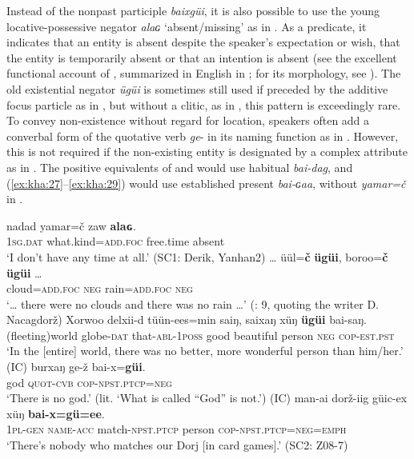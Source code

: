 \documentclass[output=paper,colorlinks,citecolor=brown,chinesefont]{langscibook}
\begin{document}
Instead of the nonpast participle \textit{baixgüi}, it is also possible to use the young locative-possessive negator \textit{alaɢ} ‘absent/missing’ as in . As a predicate, it indicates that an entity is absent despite the speaker’s expectation or wish, that the entity is temporarily absent or that an intention is absent (see the excellent functional account of \citealt{Umetani2004}, summarized in English in \citealt[97--98]{Brosig2015Negation}; for its morphology, see \citealt{Monx-Amgalan1999}). The old existential negator \textit{ügüi} is sometimes still used if preceded by the additive focus particle as in , but without a clitic, as in , this pattern is exceedingly rare. To convey non-existence without regard for location, speakers often add a converbal form of the quotative verb \textit{ge}{}- in its naming function as in . However, this is not required if the non-existing entity is designated by a complex attribute as in . The positive equivalents of  and  would use habitual \textit{bai-dag}, and (\ref{ex:kha:27}--\ref{ex:kha:29}) would use established present \textit{bai{}-ɢaa}, without \textit{yamar=č} in .

\ea\label{ex:kha:29}
    \gll nadad yamar=č zaw \textbf{alaɢ}. \\ 
         \textsc{1sg.dat} what.kind=\textsc{add.foc} free.time absent \\
    \glt ‘I don’t have any time at all.’ (SC1: Derik, Yanhan2)
\z 
\ea\label{ex:kha:30}
    \gll … üül=\textbf{č} \textbf{ügüi}, boroo=\textbf{č} \textbf{ügüi} … \\ %
         {} cloud=\textsc{add.foc} \textsc{neg} rain=\textsc{add.foc} \textsc{neg} \\
    \glt ‘… there were no clouds and there was no rain …’ (\citealt{Bjambasan2001}: 9, quoting the writer D. Nacagdorž)
\z 
\ea\label{ex:kha:31}
    \gll Xorwoo delxii-d tüün-ees=min saiŋ, saixaŋ xüŋ \textbf{ügüi} bai-saŋ.\\ 
         (fleeting)world globe-\textsc{dat} that-\textsc{abl-1poss} good   beautiful person \textsc{neg} \textsc{cop-est.pst}\\
    \glt ‘In the [entire] world, there was no better, more wonderful person than him/her.’ (IC)
\z 
\ea\label{ex:kha:32}
    \gll burxaŋ ge-ž bai-x=\textbf{güi}. \\ 
         god \textsc{quot-cvb} \textsc{cop-npst.ptcp=neg} \\
    \glt ‘There is no god.’ (lit. ‘What is called “God” is not.’) (IC)
\z 
\ea\label{ex:kha:33}
    \gll man-ai dorž-iig güic-ex xüŋ \textbf{bai-x=gü=ee}. \\ 
         \textsc{1pl-gen} \textsc{name}-\textsc{acc} match-\textsc{npst.ptcp} person \textsc{cop-npst.ptcp=neg=emph} \\
    \glt ‘There’s nobody who matches our Dorj [in card games].’ (SC2: Z08-7)
\z 
\end{document}
